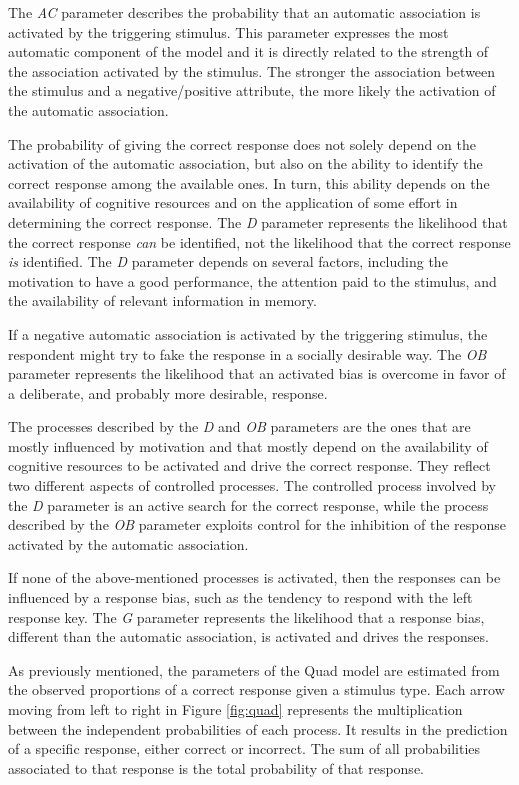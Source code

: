 \documentclass[12pt]{book}
\begin{document}
The \emph{AC} parameter describes the probability that an automatic association is activated by the triggering stimulus. This parameter expresses the most automatic component of the model and it is directly related to the strength of the association activated by the stimulus. The stronger the association between the stimulus and a negative/positive attribute, the more likely the activation of the automatic association.

The probability of giving the correct response does not solely depend on the activation of the automatic association, but also on the ability to identify the correct response among the available ones. In turn, this ability depends on the availability of cognitive resources and on the application of some effort in determining the correct response. The \emph{D} parameter represents the likelihood that the correct response \emph{can} be identified, not the likelihood that the correct response \emph{is} identified. The \emph{D} parameter depends on several factors, including the motivation to have a good performance, the attention paid to the stimulus, and the availability of relevant information in memory.

If a negative automatic association is activated by the triggering stimulus, the respondent might try to fake the response in a socially desirable way. The \emph{OB} parameter represents the likelihood that an activated bias is overcome in favor of a deliberate, and probably more desirable, response. 

The processes described by the \emph{D} and \emph{OB} parameters are the ones that are mostly influenced by motivation and that mostly depend on the availability of cognitive resources  to be activated and drive the correct response. They reflect two different aspects of controlled processes. The controlled process involved by the \emph{D} parameter is an active search for the correct response, while the process described by the \emph{OB} parameter  exploits control for the inhibition of the response activated by the automatic association. 

If none of the above-mentioned processes is activated, then the responses can be influenced by a response bias, such as the tendency to respond with the left response key. The \emph{G} parameter represents the likelihood that a response bias, different than the automatic association, is activated and drives the responses. 

As previously mentioned, the parameters of the Quad model are estimated from the observed proportions of a correct response given a stimulus type. Each arrow moving from left to right in Figure \ref{fig:quad} represents the multiplication between the independent probabilities of each process. It results in the prediction of a specific response, either correct or incorrect. 
The sum of all probabilities associated to that response is the total probability of that response.
\end{document}

